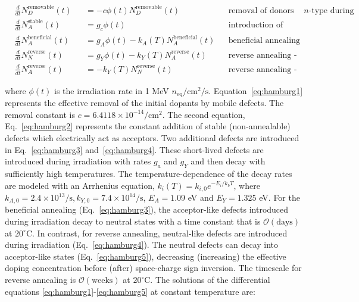 \begin{align}
\label{eq:hamburg1}
&\frac{d }{d t}N_{D}^\text{removable}(t) &&=-c\phi(t) N_{D}^\text{removable}(t)&&\text{removal of donors for $n$-type during irradiation}\\\label{eq:hamburg2}
&\frac{d }{d t}N_{A}^\text{stable}(t) &&= g_c\phi(t)&&\text{introduction of stable defects during irradiation}\\\label{eq:hamburg3}
&\frac{d }{d t}N_{A}^\text{beneficial}(t)  &&=g_A\phi(t)-k_A(T)N_{A}^\text{beneficial}(t) &&\text{beneficial annealing}\\\label{eq:hamburg4}
&\frac{d }{d t}N_{N}^\text{reverse}(t)  &&= g_Y\phi(t)-k_Y(T)N_{A}^\text{reverse}(t) &&\text{reverse annealing - neutrals}\\\label{eq:hamburg5}
&\frac{d }{d t}N_{A}^\text{reverse}(t)  &&= - k_Y(T)N_{N}^\text{reverse}(t) &&\text{reverse annealing - acceptors} 
\end{align}

\noindent where $\phi(t)$ is the irradiation rate in 1 MeV $n_\text{eq}/\text{cm}^2/\text{s}$.  Equation~\ref{eq:hamburg1} represents the effective removal of the initial dopants by mobile defects.  The removal constant is $c=6.4118\times 10^{-14}/\text{cm}^2$.  The second equation, Eq.~\ref{eq:hamburg2} represents the constant addition of stable (non-annealable) defects which electrically act as acceptors.  Two additional defects are introduced in Eq.~\ref{eq:hamburg3} and~\ref{eq:hamburg4}.  These short-lived defects are introduced during irradiation with rates $g_a$ and $g_Y$ and then decay with sufficiently high temperatures.  The temperature-dependence of the decay rates are modeled with an Arrhenius equation, $k_i(T)=k_{i,0}e^{-E_i/k_bT}$, where $k_{A,0}=2.4\times 10^{13}/\text{s}, k_{Y,0}=7.4\times 10^{14}/\text{s}$, $E_A=1.09$ eV and $E_Y=1.325$ eV.  For the beneficial annealing (Eq.~\ref{eq:hamburg3}), the acceptor-like defects introduced during irradiation decay to neutral states with a time constant that is $\mathcal{O}(\text{days})$ at $20^{\circ}$C.  In contrast, for reverse annealing, neutral-like defects are introduced during irradiation (Eq.~\ref{eq:hamburg4}). The neutral defects can decay into acceptor-like states (Eq.~\ref{eq:hamburg5}), decreasing (increasing) the effective doping concentration before (after) space-charge sign inversion.  The timescale for reverse annealing is $\mathcal{O}(\text{weeks})$ at $20^{\circ}$C.  The solutions of the differential equations \ref{eq:hamburg1}-\ref{eq:hamburg5} at constant temperature are:

